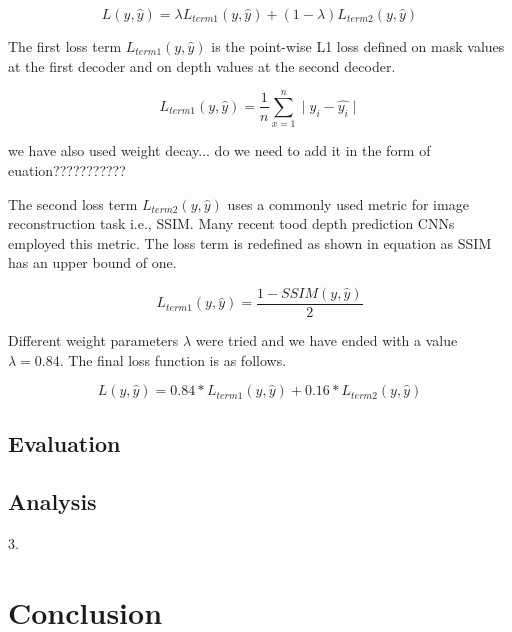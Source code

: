 \documentclass{article}
\begin{document}
\begin{equation}
L(y, \hat{y}) = \lambda L_{term1}(y, \hat{y}) + (1 - \lambda) L_{term2}(y, \hat{y})
\end{equation}

The first loss term $L_{term1}(y, \hat{y})$ is the point-wise L1 loss defined on mask values at the first decoder and on depth values at the second decoder.

\begin{equation}
L_{term1}(y, \hat{y}) = \frac{1}{n} \sum_{x=1}^{n} \mid y_i - \hat{y_i} \mid
\end{equation}

we have also used weight decay... do we need to add it in the form of euation???????????

The second loss term $L_{term2}(y, \hat{y})$ uses a commonly used metric for image reconstruction task i.e., SSIM. Many recent tood depth prediction CNNs employed this metric. The loss term is redefined as shown in equation as SSIM has an upper bound of one.

\begin{equation}
L_{term1}(y, \hat{y}) = \frac{1 - SSIM(y, \hat{y})}{2}
\end{equation}

Different weight parameters $\lambda$ were tried and we have ended with a value $\lambda = 0.84$. The final loss function is as follows.

\begin{equation}
L(y, \hat{y}) = 0.84 \ast L_{term1}(y, \hat{y}) + 0.16 \ast L_{term2}(y, \hat{y})
\end{equation}

\subsection{Evaluation}
\subsection{Analysis}

3. 
\section{Conclusion}
\end{document}
